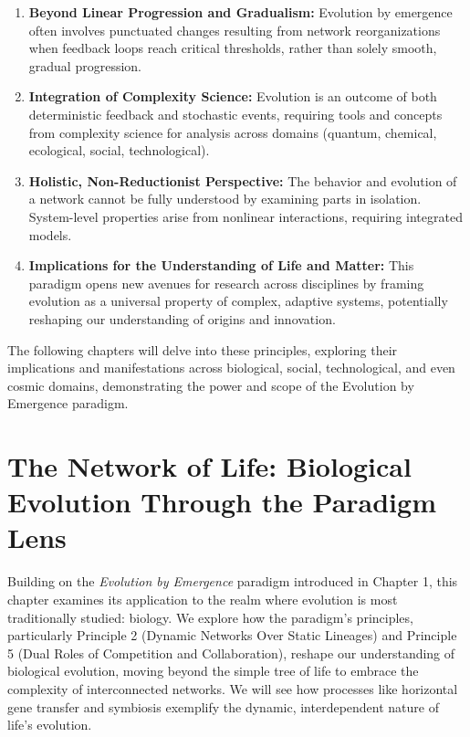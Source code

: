 \documentclass[12pt,openany]{book}
\let\cleardoublepage\clearpage %
\begin{document}
\begin{enumerate}
    \item \textbf{Beyond Linear Progression and Gradualism:} Evolution by emergence often involves punctuated changes resulting from network reorganizations when feedback loops reach critical thresholds, rather than solely smooth, gradual progression.

    \item \textbf{Integration of Complexity Science:} Evolution is an outcome of both deterministic feedback and stochastic events, requiring tools and concepts from complexity science for analysis across domains (quantum, chemical, ecological, social, technological).

    \item \textbf{Holistic, Non-Reductionist Perspective:} The behavior and evolution of a network cannot be fully understood by examining parts in isolation. System-level properties arise from nonlinear interactions, requiring integrated models.

    \item \textbf{Implications for the Understanding of Life and Matter:} This paradigm opens new avenues for research across disciplines by framing evolution as a universal property of complex, adaptive systems, potentially reshaping our understanding of origins and innovation.
\end{enumerate}

The following chapters will delve into these principles, exploring their implications and manifestations across biological, social, technological, and even cosmic domains, demonstrating the power and scope of the Evolution by Emergence paradigm. %
\cleardoublepage

\chapter{The Network of Life: Biological Evolution Through the Paradigm Lens} %
\label{ch:NetworkOfLife}

Building on the \emph{Evolution by Emergence} paradigm introduced in Chapter 1, this chapter examines its application to the realm where evolution is most traditionally studied: biology. We explore how the paradigm's principles, particularly Principle 2 (Dynamic Networks Over Static Lineages) and Principle 5 (Dual Roles of Competition and Collaboration), reshape our understanding of biological evolution, moving beyond the simple tree of life to embrace the complexity of interconnected networks. We will see how processes like horizontal gene transfer and symbiosis exemplify the dynamic, interdependent nature of life's evolution. %
\end{document}
